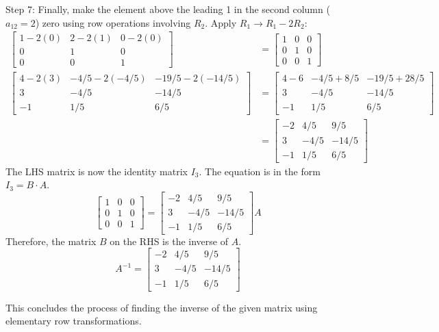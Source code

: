 \documentclass{article}
\begin{document}
Step 7: Finally, make the element above the leading 1 in the second column ($a_{12}=2$) zero using row operations involving $R_2$.
Apply $R_1 \to R_1 - 2R_2$:
\begin{align*} \begin{bmatrix} 1 - 2(0) & 2 - 2(1) & 0 - 2(0) \\ 0 & 1 & 0 \\ 0 & 0 & 1 \end{bmatrix} &= \begin{bmatrix} 1 & 0 & 0 \\ 0 & 1 & 0 \\ 0 & 0 & 1 \end{bmatrix} \\ \begin{bmatrix} 4 - 2(3) & -4/5 - 2(-4/5) & -19/5 - 2(-14/5) \\ 3 & -4/5 & -14/5 \\ -1 & 1/5 & 6/5 \end{bmatrix} &= \begin{bmatrix} 4 - 6 & -4/5 + 8/5 & -19/5 + 28/5 \\ 3 & -4/5 & -14/5 \\ -1 & 1/5 & 6/5 \end{bmatrix} \\ &= \begin{bmatrix} -2 & 4/5 & 9/5 \\ 3 & -4/5 & -14/5 \\ -1 & 1/5 & 6/5 \end{bmatrix}\end{align*}
The LHS matrix is now the identity matrix $I_3$. The equation is in the form $I_3 = B \cdot A$.
\[ \begin{bmatrix} 1 & 0 & 0 \\ 0 & 1 & 0 \\ 0 & 0 & 1 \end{bmatrix} = \begin{bmatrix} -2 & 4/5 & 9/5 \\ 3 & -4/5 & -14/5 \\ -1 & 1/5 & 6/5 \end{bmatrix} A \]
Therefore, the matrix $B$ on the RHS is the inverse of $A$.
\[ A^{-1} = \begin{bmatrix} -2 & 4/5 & 9/5 \\ 3 & -4/5 & -14/5 \\ -1 & 1/5 & 6/5 \end{bmatrix} \]

This concludes the process of finding the inverse of the given matrix using elementary row transformations.
\end{document}
